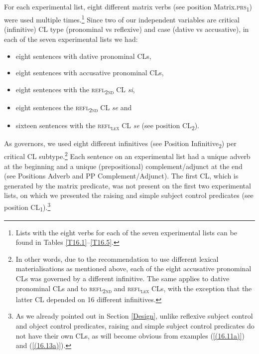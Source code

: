 \begin{sloppypar}For each experimental list, eight different matrix verbs (see position Matrix.\textsc{prs}\textsubscript{1}) were used multiple times.\footnote{Lists with the eight verbs for each of the seven experimental lists can be found in Tables \ref{T16.1}--\ref{T16.5}.} Since two of our independent variables are critical (infinitive) CL type (pronominal vs reflexive) and case (dative vs accusative), in each of the seven experimental lists we had:\end{sloppypar}

\begin{itemize}
\item eight sentences with dative pronominal CLs, 
\item eight sentences with accusative pronominal CLs, 
\item eight sentences with the \textsc{refl\textsubscript{2nd}} CL \textit{si}, 
\item eight sentences the \textsc{refl\textsubscript{2nd}} CL \textit{se} and 
\item sixteen sentences with the \textsc{refl\textsubscript{\textsc{lex}}} CL \textit{se} (see position CL\textsubscript{2}). 
\end{itemize}

As governors, we used eight different infinitives (see Position Infinitive\textsubscript{2}) per critical CL subtype.\footnote{In other words, due to the recommendation to use different lexical materialisations as mentioned above, each of the eight accusative pronominal CLs was governed by a different infinitive. The same applies to dative pronominal CLs and to \textsc{refl\textsubscript{2nd}} and \textsc{refl\textsubscript{\textsc{lex}}} CLs, with the exception that the latter CL depended on 16 different infinitives.} Each sentence on an experimental list had a unique adverb at the beginning and a unique (prepositional) complement/adjunct at the end (see Positions Adverb and PP Complement/Adjunct). The first CL, which is generated by the matrix predicate, was not present on the first two experimental lists, on which we presented the raising and simple subject control predicates (see position CL\textsubscript{1}).\footnote{As we already pointed out in Section \ref{Design}, unlike reflexive subject control and object control predicates, raising and simple subject control predicates do not have their own CLs, as will become obvious from examples (\ref{(16.11a)}) and (\ref{(16.13a)}).}

